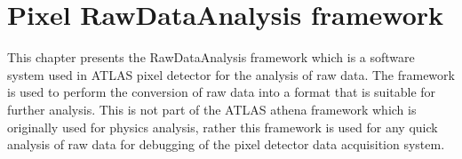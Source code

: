 \chapter{Pixel RawDataAnalysis framework}
This chapter presents the RawDataAnalysis framework which is a software system used in ATLAS pixel detector for the analysis of raw data. The framework is used to perform the conversion of raw data into a format that is suitable for further analysis. This is not part of the ATLAS athena framework which is originally used for physics analysis, rather this framework is used for any quick analysis of raw data for debugging of the pixel detector data acquisition system.